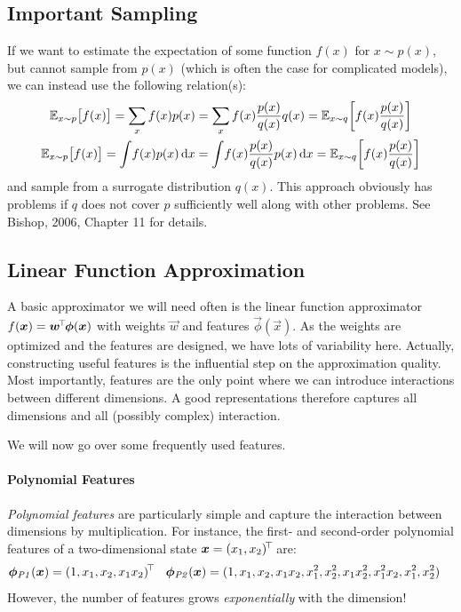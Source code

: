 		\subsection{Important Sampling}
			If we want to estimate the expectation of some function \(f(x)\) for \( x \sim p(x) \), but cannot sample from \(p(x)\) (which is often the case for complicated models), we can instead use the following relation(s):
			\begin{gather}
				\mathbb{E}_{x \sim p}\bigl[ f(x) \bigr]
					= \sum_x f(x) p(x)
					= \sum_x f(x) \frac{p(x)}{q(x)} q(x)
					= \mathbb{E}_{x \sim q} \biggl[ f(x) \frac{p(x)}{q(x)} \biggr] \\
				\mathbb{E}_{x \sim p}\bigl[ f(x) \bigr]
					= \int\! f(x) p(x) \dd{x}
					= \int\! f(x) \frac{p(x)}{q(x)} p(x) \dd{x}
					= \mathbb{E}_{x \sim q} \biggl[ f(x) \frac{p(x)}{q(x)} \biggr]
			\end{gather}
			and sample from a surrogate distribution \(q(x)\). This approach obviously has problems if \(q\) does not cover \(p\) sufficiently well along with other problems. See Bishop, 2006, Chapter 11 for details.

		\subsection{Linear Function Approximation}
			A basic approximator we will need often is the linear function approximator \( f(\bm{x}) = \bm{w}^{\!\top\!} \bm{\phi}(\bm{x}) \) with weights \(\vec{w}\) and features \(\vec{\phi}(\vec{x})\). As the weights are optimized and the features are designed, we have lots of variability here. Actually, constructing useful features is the influential step on the approximation quality. Most importantly, features are the only point where we can introduce interactions between different dimensions. A good representations therefore captures all dimensions and all (possibly complex) interaction.

			We will now go over some frequently used features.

			\paragraph{Polynomial Features}
				\emph{Polynomial features} are particularly simple and capture the interaction between dimensions by multiplication. For instance, the first- and second-order polynomial features of a two-dimensional state \( \bm{x} = (x_1, x_2)^{\!\top\!} \) are:
				\begin{align}
					\bm{\phi}_\mathit{P1}(\bm{x}) &= (1, x_1, x_2, x_1 x_2)^{\!\top\!} &
					\bm{\phi}_\mathit{P2}(\bm{x}) &= (1, x_1, x_2, x_1 x_2, x_1^2, x_2^2, x_1 x_2^2, x_1^2 x_2, x_1^2, x_2^2)
				\end{align}
				However, the number of features grows \emph{exponentially} with the dimension!

